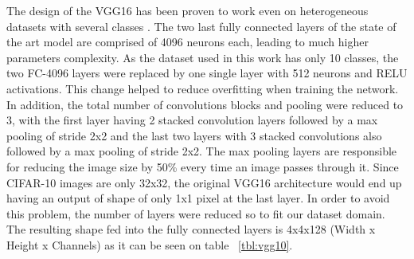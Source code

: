 The design of the VGG16 has been proven to work even on heterogeneous datasets with several classes . The two last fully connected layers of the state of the art model are comprised of 4096 neurons each, leading to much higher parameters complexity. As the dataset used in this work has only 10 classes, the two FC-4096 layers were replaced by one single layer with 512 neurons and RELU activations. This change helped to reduce overfitting when training the network. In addition, the total number of convolutions blocks and pooling were reduced to 3, with the first layer having 2 stacked convolution layers followed by a max pooling of stride 2x2 and the last two layers with 3 stacked convolutions also followed by a max pooling of stride 2x2. The max pooling layers are responsible for reducing the image size by 50\% every time an image passes through it. Since CIFAR-10 images are only 32x32, the original VGG16 architecture would end up having an output of shape of only 1x1 pixel at the last layer. In order to avoid this problem, the number of layers were reduced so to fit our dataset domain. The resulting shape fed into the fully connected layers is 4x4x128 (Width x Height x Channels) as it can be seen on table ~\ref{tbl:vgg10}. 


